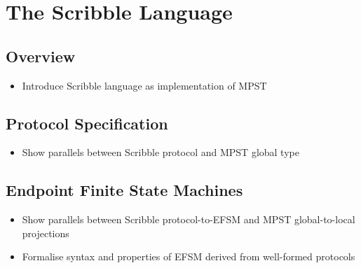 \section{The Scribble Language}

\subsection{Overview}
\begin{itemize}
\item Introduce Scribble language as implementation of MPST
\end{itemize}

\subsection{Protocol Specification}
\begin{itemize}
\item Show parallels between Scribble protocol and MPST global type
\end{itemize}

\subsection{Endpoint Finite State Machines}
\begin{itemize}
\item Show parallels between Scribble protocol-to-EFSM and MPST global-to-local projections
\item Formalise syntax and properties of EFSM derived from well-formed protocols
\end{itemize}

